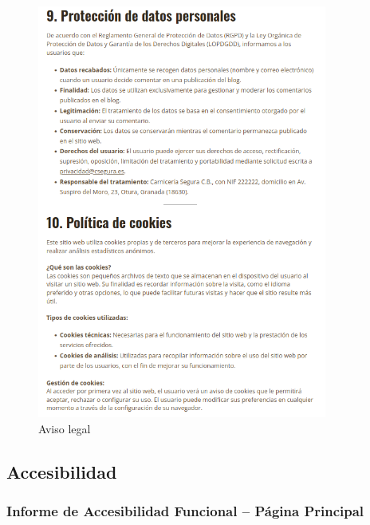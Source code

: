 \documentclass[a4paper]{article}
\begin{document}
\begin{figure}[H]
    \centering
    \includegraphics[width=0.85\textwidth]{images/legal3.png}
    \caption{Aviso legal}
\end{figure}

\subsection{Accesibilidad}

\subsubsection{Informe de Accesibilidad Funcional – Página Principal}
\end{document}
